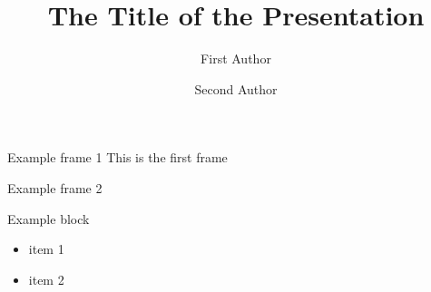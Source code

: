 \documentclass{beamer}
\title[]{The Title of the Presentation}
\institute[]{Eindhoven University of Technology, The Netherlands}
\author{First Author \and Second Author}
\begin{document}
{
\frame{\titlepage}
}

{

}

\begin{frame}{Example frame 1}
This is the first frame
\end{frame}

\begin{frame}{Example frame 2}
\begin{block}{Example block}
\begin{itemize}
\item item 1
\item item 2
\end{itemize}
\end{block}
\end{frame}
\end{document}
